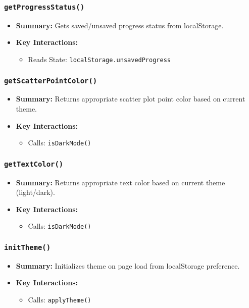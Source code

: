 \documentclass[11pt,letterpaper]{article}
\begin{document}
\subsubsection{\texttt{getProgressStatus()}}
\begin{itemize}
    \item \textbf{Summary:} Gets saved/unsaved progress status from localStorage.
    \item \textbf{Key Interactions:}
    \begin{itemize}
        \item Reads State: \texttt{localStorage.unsavedProgress}
    \end{itemize}
\end{itemize}

\subsubsection{\texttt{getScatterPointColor()}}
\begin{itemize}
    \item \textbf{Summary:} Returns appropriate scatter plot point color based on current theme.
    \item \textbf{Key Interactions:}
    \begin{itemize}
        \item Calls: \texttt{isDarkMode()}
    \end{itemize}
\end{itemize}

\subsubsection{\texttt{getTextColor()}}
\begin{itemize}
    \item \textbf{Summary:} Returns appropriate text color based on current theme (light/dark).
    \item \textbf{Key Interactions:}
    \begin{itemize}
        \item Calls: \texttt{isDarkMode()}
    \end{itemize}
\end{itemize}

\subsubsection{\texttt{initTheme()}}
\begin{itemize}
    \item \textbf{Summary:} Initializes theme on page load from localStorage preference.
    \item \textbf{Key Interactions:}
    \begin{itemize}
        \item Calls: \texttt{applyTheme()}
    \end{itemize}
\end{itemize}
\end{document}
